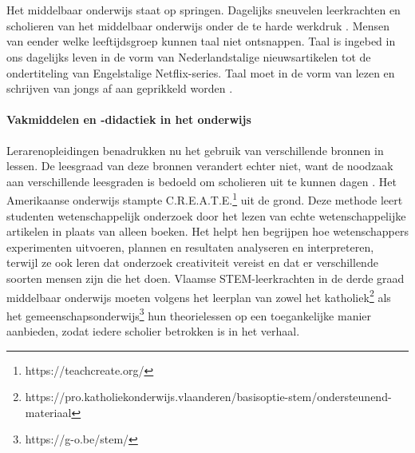 
\chapter{}%
\label{ch:inleiding}


Het middelbaar onderwijs staat op springen. Dagelijks sneuvelen leerkrachten en scholieren van het middelbaar onderwijs onder de te harde werkdruk \autocite{Glorieux2018}. Mensen van eender welke leeftijdsgroep kunnen taal niet ontsnappen. Taal is ingebed in ons dagelijks leven in de vorm van Nederlandstalige nieuwsartikelen tot de ondertiteling van Engelstalige Netflix-series. Taal moet in de vorm van lezen en schrijven van jongs af aan geprikkeld worden \autocite{Daoud2023}.

\subsubsection{Vakmiddelen en -didactiek in het onderwijs}
Lerarenopleidingen benadrukken nu het gebruik van verschillende bronnen in lessen. De leesgraad van deze bronnen verandert echter niet, want de noodzaak aan verschillende leesgraden is bedoeld om scholieren uit te kunnen dagen \autocite{Surma2019}. Het Amerikaanse onderwijs stampte C.R.E.A.T.E.\footnote{https://teachcreate.org/} uit de grond. Deze methode leert studenten wetenschappelijk onderzoek door het lezen van echte wetenschappelijke artikelen in plaats van alleen boeken. Het helpt hen begrijpen hoe wetenschappers experimenten uitvoeren, plannen en resultaten analyseren en interpreteren, terwijl ze ook leren dat onderzoek creativiteit vereist en dat er verschillende soorten mensen zijn die het doen. Vlaamse STEM-leerkrachten in de derde graad middelbaar onderwijs moeten volgens het leerplan van zowel het katholiek\footnote{https://pro.katholiekonderwijs.vlaanderen/basisoptie-stem/ondersteunend-materiaal} als het gemeenschapsonderwijs\footnote{https://g-o.be/stem/} hun theorielessen op een toegankelijke manier aanbieden, zodat iedere scholier betrokken is in het verhaal.

